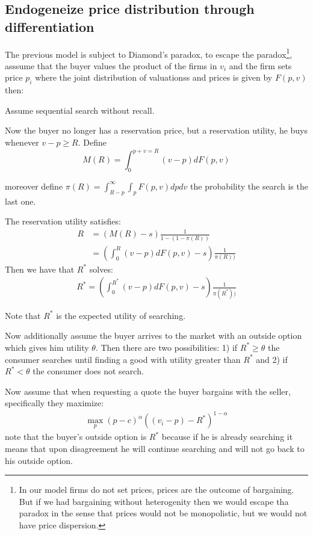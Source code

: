 \documentclass[12pt]{article}
\theoremstyle{plain}
\theoremstyle{plain}
\begin{document}
\subsection{Endogeneize price distribution through differentiation}

The previous model is subject to Diamond's paradox, to escape the paradox\footnote{In our model firms do not set prices, prices are the outcome of bargaining. But if we had bargaining without heterogenity then we would escape tha paradox in the sense that prices would not be monopolistic, but we would not have price dispersion. }, asssume that the buyer values the product of the firms in $v_i$ and the firm sets price $p_i$ where the joint distribution of valuationss and prices is given by $F(p,v)$ then: 

Assume sequential search without recall. 

Now the buyer no longer has a reservation price, but a reservation utility, he buys whenever $v-p\geq R$. 
Define
$$M(R) = \int_0^{p+v=R} (v-p)dF(p,v)$$ 

moreover define $\pi(R) = \int_{R-p}^\infty \int_p F(p,v)dpdv$ the probability the search is the last one. 

The reservation utility satisfies: 
\begin{align*}
        R &= (M(R)-s)\frac{1}{1-(1-\pi(R))} \\
        &= \left( \int_0^R (v-p)dF(p,v)-s\right)\frac{1}{\pi(R))} 
\end{align*}
Then we have that $R^*$ solves: 
\begin{align}\label{eq:reservation_utility}
        R^* = \left( \int_0^{R^*} (v-p)dF(p,v)-s\right)\frac{1}{\pi(R^*))} 
\end{align}


Note that $R^*$ is the expected utility of searching. 

Now additionally assume the buyer arrives to the market with an outside option which gives him utility $\theta$. Then there are two possibilities: 1) if $ R^*\geq \theta $ the consumer searches until finding a good with utility greater than  $R^*$ and 2) if $R^*<\theta$ the consumer does not search.

Now assume that when requesting a quote the buyer bargains with the seller, specifically they maximize: 
\begin{align*}
    \max_p (p-c)^\alpha ((v_i-p) - R^*)^{1-\alpha}
\end{align*}
note that the buyer's outside option is $R^*$ because if he is already searching it means that upon disagreement he will continue searching and will not go back to his outside option. 
\end{document}
